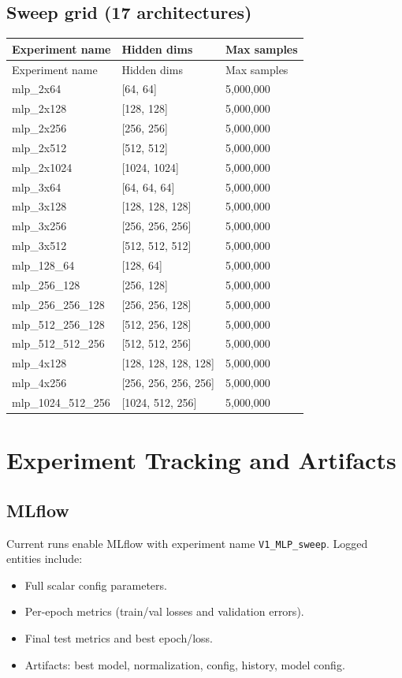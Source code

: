 \documentclass[11pt,a4paper]{article}
\begin{document}
\subsection{Sweep grid (17 architectures)}
\begin{longtable}{>{\ttfamily}p{} p{} p{}}
\toprule
Experiment name & Hidden dims & Max samples \\
\midrule
\endfirsthead
\toprule
Experiment name & Hidden dims & Max samples \\
\midrule
\endhead
mlp\_2x64 & [64, 64] & 5,000,000 \\
mlp\_2x128 & [128, 128] & 5,000,000 \\
mlp\_2x256 & [256, 256] & 5,000,000 \\
mlp\_2x512 & [512, 512] & 5,000,000 \\
mlp\_2x1024 & [1024, 1024] & 5,000,000 \\
mlp\_3x64 & [64, 64, 64] & 5,000,000 \\
mlp\_3x128 & [128, 128, 128] & 5,000,000 \\
mlp\_3x256 & [256, 256, 256] & 5,000,000 \\
mlp\_3x512 & [512, 512, 512] & 5,000,000 \\
mlp\_128\_64 & [128, 64] & 5,000,000 \\
mlp\_256\_128 & [256, 128] & 5,000,000 \\
mlp\_256\_256\_128 & [256, 256, 128] & 5,000,000 \\
mlp\_512\_256\_128 & [512, 256, 128] & 5,000,000 \\
mlp\_512\_512\_256 & [512, 512, 256] & 5,000,000 \\
mlp\_4x128 & [128, 128, 128, 128] & 5,000,000 \\
mlp\_4x256 & [256, 256, 256, 256] & 5,000,000 \\
mlp\_1024\_512\_256 & [1024, 512, 256] & 5,000,000 \\
\bottomrule
\end{longtable}

\section{Experiment Tracking and Artifacts}
\subsection{MLflow}
Current runs enable MLflow with experiment name \texttt{V1\_MLP\_sweep}. Logged entities include:
\begin{itemize}[leftmargin=*]
  \item Full scalar config parameters.
  \item Per-epoch metrics (train/val losses and validation errors).
  \item Final test metrics and best epoch/loss.
  \item Artifacts: best model, normalization, config, history, model config.
\end{itemize}
\end{document}
